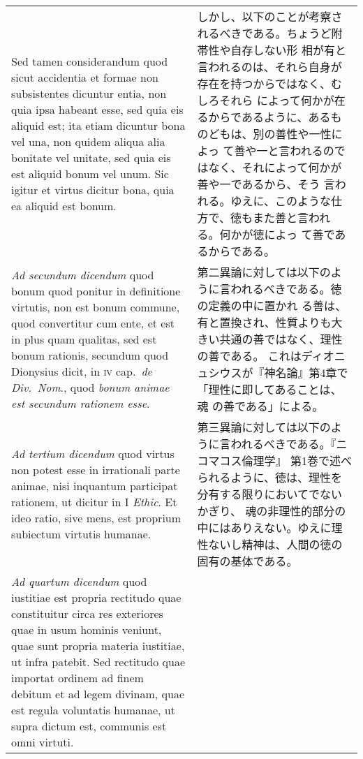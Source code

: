 \documentclass[10pt]{jsarticle}
\begin{document}
\begin{longtable}{p{21em}p{21em}}
\\

Sed tamen considerandum quod sicut accidentia et formae
non subsistentes dicuntur entia, non quia ipsa habeant esse, sed quia
eis aliquid est; ita etiam dicuntur bona vel una, non quidem aliqua
alia bonitate vel unitate, sed quia eis est aliquid bonum vel
unum. Sic igitur et virtus dicitur bona, quia ea aliquid est bonum.

&

しかし、以下のことが考察されるべきである。ちょうど附帯性や自存しない形
相が有と言われるのは、それら自身が存在を持つからではなく、むしろそれら
によって何かが在るからであるように、あるものどもは、別の善性や一性によっ
て善や一と言われるのではなく、それによって何かが善や一であるから、そう
言われる。ゆえに、このような仕方で、徳もまた善と言われる。何かが徳によっ
て善であるからである。

\\

{\itshape Ad secundum dicendum} quod bonum quod ponitur in definitione
virtutis, non est bonum commune, quod convertitur cum ente, et est in
plus quam qualitas, sed est bonum rationis, secundum quod Dionysius
dicit, in {\scshape iv} cap.~{\itshape de Div.~Nom}., quod {\itshape
bonum animae est secundum rationem esse}.

&

第二異論に対しては以下のように言われるべきである。徳の定義の中に置かれ
る善は、有と置換され、性質よりも大きい共通の善ではなく、理性の善である。
これはディオニュシウスが『神名論』第4章で「理性に即してあることは、魂
の善である」による。

\\

{\itshape Ad tertium dicendum} quod virtus non potest esse in
irrationali parte animae, nisi inquantum participat rationem, ut
dicitur in I {\itshape Ethic}. Et ideo ratio, sive mens, est proprium
subiectum virtutis humanae.

&

第三異論に対しては以下のように言われるべきである。『ニコマコス倫理学』
第1巻で述べられるように、徳は、理性を分有する限りにおいてでないかぎり、
魂の非理性的部分の中にはありえない。ゆえに理性ないし精神は、人間の徳の
固有の基体である。

\\

{\itshape Ad quartum dicendum} quod iustitiae est propria rectitudo
quae constituitur circa res exteriores quae in usum hominis veniunt,
quae sunt propria materia iustitiae, ut infra patebit. Sed rectitudo
quae importat ordinem ad finem debitum et ad legem divinam, quae est
regula voluntatis humanae, ut supra dictum est, communis est omni
virtuti.


\end{longtable}
\end{document}
